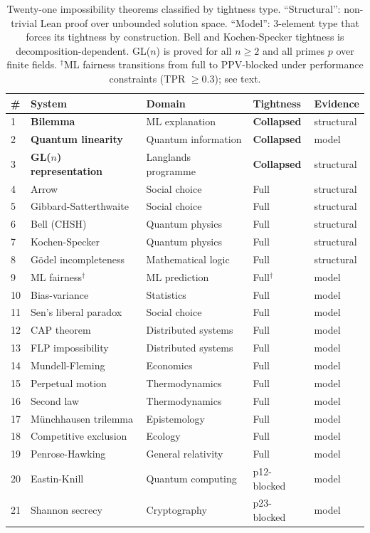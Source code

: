 \documentclass[11pt,a4paper]{article}
\begin{document}
\begin{table}[h]
\centering
\small
\caption{Twenty-one impossibility theorems classified by tightness type.  ``Structural'': non-trivial Lean proof over unbounded solution space.  ``Model'': 3-element type that forces its tightness by construction.  Bell and Kochen-Specker tightness is decomposition-dependent.  GL($n$) is proved for all $n \geq 2$ and all primes $p$ over finite fields.  $^\dagger$ML fairness transitions from full to PPV-blocked under performance constraints (TPR $\geq 0.3$); see text.}
\label{tab:classification}
\begin{tabular}{@{}lllll@{}}
\toprule
\# & System & Domain & Tightness & Evidence \\
\midrule
1 & \textbf{Bilemma} & ML explanation & \textbf{Collapsed} & structural \\
2 & \textbf{Quantum linearity} & Quantum information & \textbf{Collapsed} & model \\
3 & \textbf{GL($n$) representation} & Langlands programme & \textbf{Collapsed} & structural \\
\midrule
4 & Arrow & Social choice & Full & structural \\
5 & Gibbard-Satterthwaite & Social choice & Full & structural \\
6 & Bell (CHSH) & Quantum physics & Full & structural \\
7 & Kochen-Specker & Quantum physics & Full & structural \\
8 & G\"odel incompleteness & Mathematical logic & Full & structural \\
9 & ML fairness$^\dagger$ & ML prediction & Full$^\dagger$ & model \\
10 & Bias-variance & Statistics & Full & model \\
11 & Sen's liberal paradox & Social choice & Full & model \\
12 & CAP theorem & Distributed systems & Full & model \\
13 & FLP impossibility & Distributed systems & Full & model \\
14 & Mundell-Fleming & Economics & Full & model \\
15 & Perpetual motion & Thermodynamics & Full & model \\
16 & Second law & Thermodynamics & Full & model \\
17 & M\"unchhausen trilemma & Epistemology & Full & model \\
18 & Competitive exclusion & Ecology & Full & model \\
19 & Penrose-Hawking & General relativity & Full & model \\
\midrule
20 & Eastin-Knill & Quantum computing & p12-blocked & model \\
21 & Shannon secrecy & Cryptography & p23-blocked & model \\
\bottomrule
\end{tabular}
\end{table}
\end{document}
